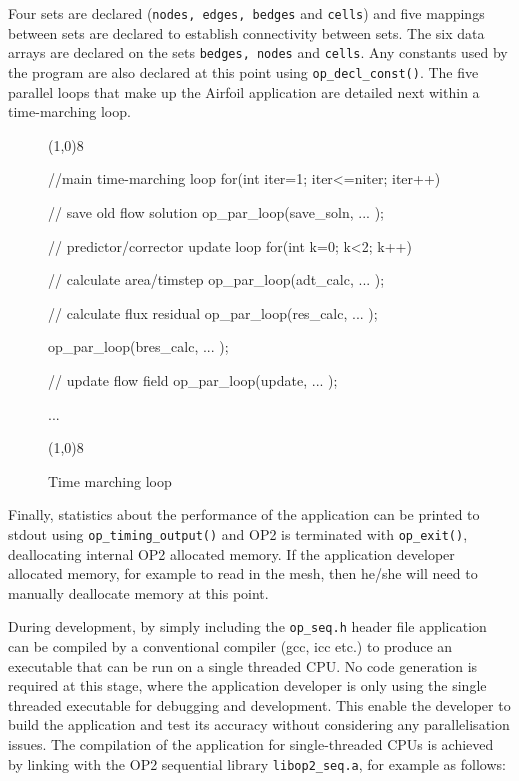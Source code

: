 \documentclass[11pt]{article}
\begin{document}
\noindent Four sets are declared (\texttt{nodes, edges, bedges} and \texttt{cells}) and five mappings between sets are
declared to establish connectivity between sets. The six data arrays are declared on the sets \texttt{bedges, nodes} and
\texttt{cells}. Any constants used by the program are also declared at this point using \texttt{op\_decl\_const()}.
The five parallel loops that make up the Airfoil application are detailed next within a time-marching loop.
\begin{figure}[!h]\small
\vspace{-0pt}\noindent\line(1,0){8}\vspace{-20pt}
\begin{pyglist}[language=c]
//main time-marching loop
for(int iter=1; iter<=niter; iter++) {
    // save old flow solution
    op_par_loop(save_soln, ... );

    // predictor/corrector update loop
    for(int k=0; k<2; k++) {

      // calculate area/timstep
      op_par_loop(adt_calc, ... );

      // calculate flux residual
      op_par_loop(res_calc, ... );

      op_par_loop(bres_calc, ... );
      
      // update flow field
      op_par_loop(update, ... );
    }
    ...
}
\end{pyglist}
\vspace{-10pt}\noindent\line(1,0){8}\vspace{-10pt}
\caption{\small Time marching loop }
\normalsize\vspace{-10pt}\label{fig:timemarching}
\end{figure}

Finally, statistics about the performance of the application can be printed to stdout using
\texttt{op\_timing\_output()} and OP2 is terminated with \texttt{op\_exit()}, deallocating internal OP2 allocated
memory. If the application developer allocated memory, for example to read in the mesh, then he/she will need to
manually deallocate memory at this point. 

During development, by simply including the \texttt{op\_seq.h} header file application can be compiled by a conventional
compiler (gcc, icc etc.) to produce an executable that can be run on a single threaded CPU. No code generation is
required at this stage, where the application developer is only using the single threaded executable for debugging and
development. This enable the developer to build the application and test its accuracy without considering any
parallelisation issues. The compilation of the application for single-threaded CPUs is achieved by linking with the OP2
sequential library \texttt{libop2\_seq.a}, for example as follows:
\end{document}
